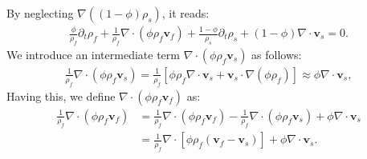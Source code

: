 By neglecting $\nabla\left(\left(1-\phi\right)\rho_s\right)$, it reads:%
\begin{equation}\label{Eq:Mass_sum_intmediate}
	\begin{aligned}
        \frac{\phi}{\rho_f }\partial_t\rho_f+\frac{1}{\rho_f}\nabla\cdot\left(\phi\rho_f \mathbf{v}_f\right)+\frac{1-\phi}{\rho_s}\partial_t\rho_s+(1-\phi)\nabla\cdot \mathbf{v}_s=0.
	\end{aligned}
\end{equation}
We introduce an intermediate term $\nabla\cdot\left(\phi\rho_f\mathbf{v}_s\right)$ as follows:
\begin{equation*}
	\begin{aligned}
    	\frac{1}{\rho_f}\nabla\cdot\left(\phi\rho_f \mathbf{v}_s\right)=\frac{1}{\rho_f}\left[\phi\rho_f\nabla\cdot\mathbf{v}_s+\mathbf{v}_s \cdot \nabla\left(\phi\rho_f\right)\right] \approx \phi\nabla\cdot\mathbf{v}_s,
    \end{aligned}
\end{equation*}
Having this, we define $\nabla\cdot\left(\phi\rho_f\mathbf{v}_f\right)$  as:
\begin{equation} \label{Eq:div_vrho_f}
	\begin{aligned}
	    \frac{1}{\rho_f}\nabla\cdot\left(\phi\rho_f\mathbf{v}_f\right)
    	&=\frac{1}{\rho_f}\nabla\cdot\left(\phi\rho_f \mathbf{v}_f\right)-\frac{1}{\rho_f}\nabla\cdot\left(\phi\rho_f \mathbf{v}_s\right)+\phi\nabla\cdot\mathbf{v}_s\\
	    &=\frac{1}{\rho_f}\nabla\cdot\left[\phi\rho_f\left(\mathbf{v}_f-\mathbf{v}_s\right)\right]+\phi\nabla\cdot\mathbf{v}_s.
    \end{aligned}
\end{equation}
